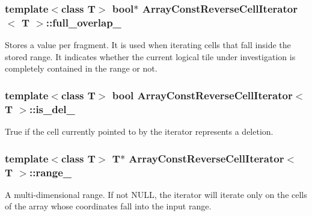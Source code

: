 \subsubsection[{full\+\_\+overlap\+\_\+}]{\setlength{\rightskip}{0pt plus 5cm}template$<$class T$>$ bool$\ast$ {\bf Array\+Const\+Reverse\+Cell\+Iterator}$<$ T $>$\+::full\+\_\+overlap\+\_\+\hspace{0.3cm}{\ttfamily [private]}}\label{classArrayConstReverseCellIterator_a523e5c0d5dc9aab36984f9f439a0ec05}
Stores a value per fragment. It is used when iterating cells that fall inside the stored range. It indicates whether the current logical tile under investigation is completely contained in the range or not. \hypertarget{classArrayConstReverseCellIterator_af00286c2d74fdb62b27e5f1351872d34}{}
\subsubsection[{is\+\_\+del\+\_\+}]{\setlength{\rightskip}{0pt plus 5cm}template$<$class T$>$ bool {\bf Array\+Const\+Reverse\+Cell\+Iterator}$<$ T $>$\+::is\+\_\+del\+\_\+\hspace{0.3cm}{\ttfamily [private]}}\label{classArrayConstReverseCellIterator_af00286c2d74fdb62b27e5f1351872d34}
True if the cell currently pointed to by the iterator represents a deletion. \hypertarget{classArrayConstReverseCellIterator_a8a5a75b3a58299ea05075eb6c3987038}{}
\subsubsection[{range\+\_\+}]{\setlength{\rightskip}{0pt plus 5cm}template$<$class T$>$ T$\ast$ {\bf Array\+Const\+Reverse\+Cell\+Iterator}$<$ T $>$\+::range\+\_\+\hspace{0.3cm}{\ttfamily [private]}}\label{classArrayConstReverseCellIterator_a8a5a75b3a58299ea05075eb6c3987038}
A multi-\/dimensional range. If not N\+U\+L\+L, the iterator will iterate only on the cells of the array whose coordinates fall into the input range. \hypertarget{classArrayConstReverseCellIterator_aee2b35201d187a50e2347e38d0a8d581}{}

